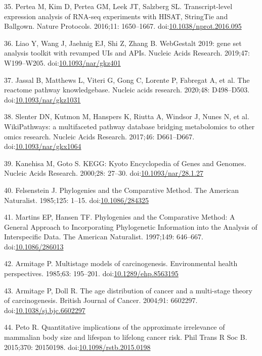 \documentclass[]{elsarticle} %
\begin{document}
\leavevmode\hypertarget{ref-Tuxedo}{}%
35. Pertea M, Kim D, Pertea GM, Leek JT, Salzberg SL. Transcript-level
expression analysis of RNA-seq experiments with HISAT, StringTie and
Ballgown. Nature Protocols. 2016;11: 1650--1667.
doi:\href{https://doi.org/10.1038/nprot.2016.095}{10.1038/nprot.2016.095}

\leavevmode\hypertarget{ref-WebGestalt2019}{}%
36. Liao Y, Wang J, Jaehnig EJ, Shi Z, Zhang B. WebGestalt 2019: gene
set analysis toolkit with revamped UIs and APIs. Nucleic Acids Research.
2019;47: W199--W205.
doi:\href{https://doi.org/10.1093/nar/gkz401}{10.1093/nar/gkz401}

\leavevmode\hypertarget{ref-Reactome}{}%
37. Jassal B, Matthews L, Viteri G, Gong C, Lorente P, Fabregat A, et
al. The reactome pathway knowledgebase. Nucleic acids research. 2020;48:
D498--D503.
doi:\href{https://doi.org/10.1093/nar/gkz1031}{10.1093/nar/gkz1031}

\leavevmode\hypertarget{ref-Wikipathways}{}%
38. Slenter DN, Kutmon M, Hanspers K, Riutta A, Windsor J, Nunes N, et
al. WikiPathways: a multifaceted pathway database bridging metabolomics
to other omics research. Nucleic Acids Research. 2017;46: D661--D667.
doi:\href{https://doi.org/10.1093/nar/gkx1064}{10.1093/nar/gkx1064}

\leavevmode\hypertarget{ref-KEGG}{}%
39. Kanehisa M, Goto S. KEGG: Kyoto Encyclopedia of Genes and Genomes.
Nucleic Acids Research. 2000;28: 27--30.
doi:\href{https://doi.org/10.1093/nar/28.1.27}{10.1093/nar/28.1.27}

\leavevmode\hypertarget{ref-Felsenstein1985}{}%
40. Felsenstein J. Phylogenies and the Comparative Method. The American
Naturalist. 1985;125: 1--15.
doi:\href{https://doi.org/10.1086/284325}{10.1086/284325}

\leavevmode\hypertarget{ref-MartinsAndHansen1997}{}%
41. Martins EP, Hansen TF. Phylogenies and the Comparative Method: A
General Approach to Incorporating Phylogenetic Information into the
Analysis of Interspecific Data. The American Naturalist. 1997;149:
646--667. doi:\href{https://doi.org/10.1086/286013}{10.1086/286013}

\leavevmode\hypertarget{ref-Armitage:19851c2}{}%
42. Armitage P. Multistage models of carcinogenesis. Environmental
health perspectives. 1985;63: 195--201.
doi:\href{https://doi.org/10.1289/ehp.8563195}{10.1289/ehp.8563195}

\leavevmode\hypertarget{ref-Armitage:20041c2}{}%
43. Armitage P, Doll R. The age distribution of cancer and a multi-stage
theory of carcinogenesis. British Journal of Cancer. 2004;91: 6602297.
doi:\href{https://doi.org/10.1038/sj.bjc.6602297}{10.1038/sj.bjc.6602297}

\leavevmode\hypertarget{ref-Peto:20151c2}{}%
44. Peto R. Quantitative implications of the approximate irrelevance of
mammalian body size and lifespan to lifelong cancer risk. Phil Trans R
Soc B. 2015;370: 20150198.
doi:\href{https://doi.org/10.1098/rstb.2015.0198}{10.1098/rstb.2015.0198}
\end{document}
